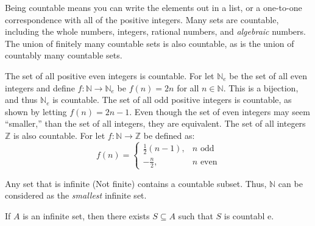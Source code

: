         Being countable means you can write
        the elements out in a list, or a
        one-to-one correspondence with all of
        the positive integers. Many sets are countable,
        including the whole numbers, integers, rational
        numbers, and \textit{algebraic} numbers. The
        union of finitely many countable sets is also
        countable, as is the union of countably many
        countable sets.
        \begin{example}
            The set of all positive even integers is
            countable. For let $\mathbb{N}_{e}$ be the
            set of all even integers and define
            $f:\mathbb{N}\rightarrow\mathbb{N}_{e}$ be
            $f(n)=2n$ for all $n\in\mathbb{N}$. This is
            a bijection, and thus $\mathbb{N}_{e}$ is
            countable. The set of all odd positive integers
            is countable, as shown by letting
            $f(n)=2n-1$. Even though the set of even
            integers may seem ``smaller,'' than the set of
            all integers, they are equivalent. The set of
            all integers $\mathbb{Z}$ is also countable.
            For let $f:\mathbb{N}\rightarrow\mathbb{Z}$
            be defined as:
            \begin{equation}
                f(n)=
                \begin{cases}
                    \frac{1}{2}(n-1),&n\textrm{ odd}\\
                    -\frac{n}{2},&n\textrm{ even}
                \end{cases}
            \end{equation}
        \end{example}
        Any set that is infinite (Not finite) contains a
        countable subset. Thus, $\mathbb{N}$ can be
        considered as the \textit{smallest} infinite set.
        \begin{theorem}
            If $A$ is an infinite set, then there exists
            $S\subseteq{A}$ such that $S$ is countabl e.
        \end{theorem}
